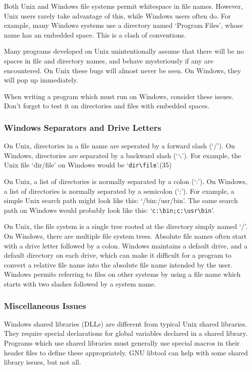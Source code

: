 Both Unix and Windows file systems permit whitespace in file names. However, Unix users rarely take advantage of this, while Windows users often do. For example, many Windows systems use a directory named `Program Files', whose name has an embedded space. This is a clash of conventions.

Many programs developed on Unix unintentionally assume that there will be no spaces in file and directory names, and behave mysteriously if any are encountered. On Unix these bugs will almost never be seen. On Windows, they will pop up immediately.

When writing a program which must run on Windows, consider these issues. Don't forget to test it on directories and files with embedded spaces. 


\subsubsection{Windows Separators and Drive Letters}

On Unix, directories in a file name are seperated by a forward slash (`/').
On Windows, directories are separated by a backward slash (`$\backslash$').
For example, the Unix file `dir/file' on Windows would be `\verb+dir\file+'.(35)

On Unix, a list of directories is normally separated by a colon (`:').
On Windows, a list of directories is normally separated by a semicolon (`;').
For example, a simple Unix search path might look like this: `/bin:/usr/bin'.
The same search path on Windows would probably look like this:
`\verb+c:\bin;c:\usr\bin+'.

On Unix, the file system is a single tree rooted at the directory simply named `/'. On Windows, there are multiple file system trees. Absolute file names often start with a drive letter followed by a colon. Windows maintains a default drive, and a default directory on each drive, which can make it difficult for a program to convert a relative file name into the absolute file name intended by the user. Windows permits referring to files on other systems by using a file name which starts with two slashes followed by a system name. 

\subsubsection{Miscellaneous Issues}

Windows shared libraries (DLLs) are different from typical Unix shared libraries. They require special declarations for global variables declared in a shared library. Programs which use shared libraries must generally use special macros in their header files to define these appropriately. GNU libtool can help with some shared library issues, but not all.


